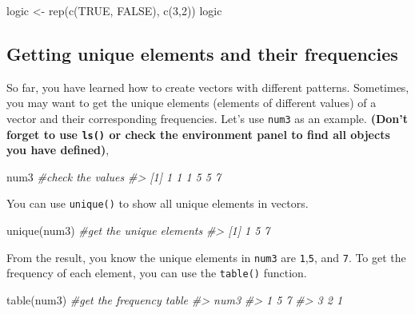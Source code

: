 \documentclass[
]{book}
\newenvironment{Shaded}{\begin{snugshade}}{\end{snugshade}}
\newcommand{\CommentTok}[1]{\textcolor[rgb]{0.56,0.35,0.01}{\textit{#1}}}
\newcommand{\ConstantTok}[1]{\textcolor[rgb]{0.00,0.00,0.00}{#1}}
\newcommand{\DecValTok}[1]{\textcolor[rgb]{0.00,0.00,0.81}{#1}}
\newcommand{\FunctionTok}[1]{\textcolor[rgb]{0.00,0.00,0.00}{#1}}
\newcommand{\NormalTok}[1]{#1}
\newcommand{\OtherTok}[1]{\textcolor[rgb]{0.56,0.35,0.01}{#1}}
\begin{document}
\begin{Shaded}
\begin{Highlighting}[]
\NormalTok{logic }\OtherTok{\textless{}{-}} \FunctionTok{rep}\NormalTok{(}\FunctionTok{c}\NormalTok{(}\ConstantTok{TRUE}\NormalTok{, }\ConstantTok{FALSE}\NormalTok{), }\FunctionTok{c}\NormalTok{(}\DecValTok{3}\NormalTok{,}\DecValTok{2}\NormalTok{))}
\NormalTok{logic}
\end{Highlighting}
\end{Shaded}

\hypertarget{getting-unique-elements-and-their-frequencies}{%
\subsection{Getting unique elements and their frequencies}\label{getting-unique-elements-and-their-frequencies}}

So far, you have learned how to create vectors with different patterns. Sometimes, you may want to get the unique elements (elements of different values) of a vector and their corresponding frequencies. Let's use \texttt{num3} as an example. \textbf{(Don't forget to use \texttt{ls()} or check the environment panel to find all objects you have defined)},

\begin{Shaded}
\begin{Highlighting}[]
\NormalTok{num3           }\CommentTok{\#check the values}
\CommentTok{\#\textgreater{} [1] 1 1 1 5 5 7}
\end{Highlighting}
\end{Shaded}

You can use \texttt{unique()} to show all unique elements in vectors.

\begin{Shaded}
\begin{Highlighting}[]
\FunctionTok{unique}\NormalTok{(num3)   }\CommentTok{\#get the unique elements}
\CommentTok{\#\textgreater{} [1] 1 5 7}
\end{Highlighting}
\end{Shaded}

From the result, you know the unique elements in \texttt{num3} are \texttt{1},\texttt{5}, and \texttt{7}. To get the frequency of each element, you can use the \texttt{table()} function.

\begin{Shaded}
\begin{Highlighting}[]
\FunctionTok{table}\NormalTok{(num3)    }\CommentTok{\#get the frequency table}
\CommentTok{\#\textgreater{} num3}
\CommentTok{\#\textgreater{} 1 5 7 }
\CommentTok{\#\textgreater{} 3 2 1}
\end{Highlighting}
\end{Shaded}
\end{document}
